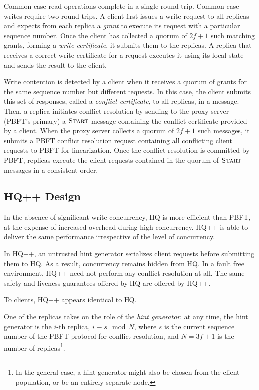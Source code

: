 \documentclass[twocolumn,10pt]{article}
\begin{document}
Common case read operations complete in a single round-trip. Common
case writes require two round-trips. A client first issues a write
request to all replicas and expects from each replica a \emph{grant}
to execute its request with a particular sequence number.  Once the
client has collected a quorum of $2f+1$ such matching grants,
forming a \emph{write certificate}, it submits them to the replicas. A
replica that receives a correct write certificate for a request
executes it using its local state and sends the result to the client.

Write contention is detected by a client when it receives a quorum of
grants for the same sequence number but different requests.  In this
case, the client submits this set of responses, called a
\emph{conflict certificate}, to all replicas, in a  message.  Then, a replica initiates 
conflict resolution by sending to the proxy server (PBFT's primary) a
$\textsc{Start}$ message containing the conflict certificate provided
by a client.  When the proxy server collects a quorum of $2f+1$ such
messages, it submits a PBFT conflict resolution request containing all
conflicting client requests to PBFT for linearization.  Once the
conflict resolution is committed by PBFT, replicas execute the client
requests contained in the quorum of $\textsc{Start}$ messages in a
consistent order.


\subsection{HQ++ Design}

In the absence of significant write concurrency, HQ is more efficient
than PBFT, at the expense of increased overhead during high
concurrency.  HQ++ is able to deliver the same performance
irrespective of the level of concurrency.

In HQ++, an untrusted hint generator serializes client
requests before submitting them to HQ. As a result, concurrency
remains hidden from HQ.  In a fault free environment, HQ++ need not
perform any conflict resolution at all.  The same safety and liveness
guarantees offered by HQ are offered by HQ++.

 To clients, HQ++ appears identical to HQ.

 One of the replicas takes on the role of the
\emph{hint generator}: at any time, the hint generator is the $i$-th
replica, $i \equiv s \mod N$, where $s$ is the current sequence
number of the PBFT protocol for conflict resolution, and $N=3f+1$ is
the number of replicas\footnote{In the general case, a hint generator
might also be chosen from the client population, or be an entirely
separate node.}.
\end{document}
